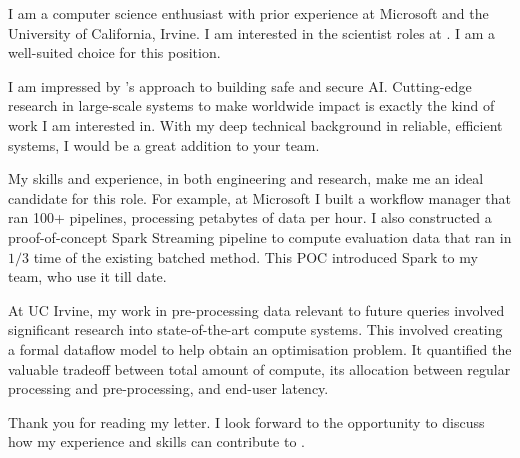 I am a computer science enthusiast with prior experience at Microsoft and the University of California, Irvine. I am interested in the scientist roles at {\company}. I am a well-suited choice for this position. 

I am impressed by {\company}'s approach to building safe and secure AI. 
Cutting-edge research in large-scale systems to make worldwide impact is exactly the kind of work I am interested in.
With my deep technical background in reliable, efficient systems, I would be a great addition to your team. 

My skills and experience, in both engineering and research, make me an ideal candidate for this role. 
For example, at Microsoft I built a workflow manager that ran 100+ pipelines, processing petabytes of data per hour. 
I also constructed a proof-of-concept 
Spark Streaming pipeline to compute evaluation data that ran in $1/3$ time of the existing batched method.
This POC introduced Spark to my team, who use it till date.

At UC Irvine, my work in pre-processing data relevant to future queries involved significant research into state-of-the-art compute systems. 
This involved creating a formal dataflow model to help obtain an optimisation problem. 
It quantified the valuable tradeoff between total amount of compute, its allocation 
between regular processing and pre-processing, and end-user latency. 

Thank you for reading my letter. I look forward to the opportunity to discuss how my experience and skills can contribute to {\company}.